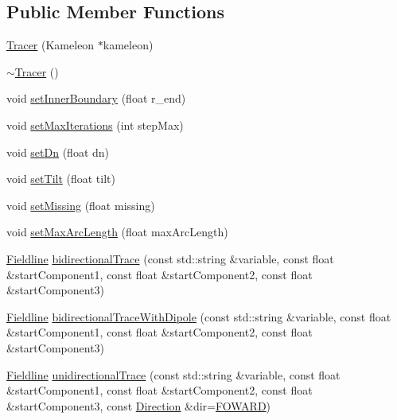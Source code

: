 \subsection*{Public Member Functions}
\begin{DoxyCompactItemize}
\item 
\hyperlink{classccmc_1_1_tracer_a16f3484aa70343874800adfce15b7d48}{Tracer} (Kameleon $\ast$kameleon)
\item 
\hyperlink{classccmc_1_1_tracer_ac9c1fdded6293841a58a3f672b775577}{$\sim$\-Tracer} ()
\item 
void \hyperlink{classccmc_1_1_tracer_a8b67d175f78a67e8f9119a9b105bfb8b}{set\-Inner\-Boundary} (float r\-\_\-end)
\item 
void \hyperlink{classccmc_1_1_tracer_aecadbaf86210183e93561cfd994e5cb3}{set\-Max\-Iterations} (int step\-Max)
\item 
void \hyperlink{classccmc_1_1_tracer_ab487539d33afad7fb6642d4bd3ccc555}{set\-Dn} (float dn)
\item 
void \hyperlink{classccmc_1_1_tracer_aa729fd6391a148f9bad170a652ec6d7d}{set\-Tilt} (float tilt)
\item 
void \hyperlink{classccmc_1_1_tracer_a2b4ada2551d3d6db929f6f4b59fe6cb0}{set\-Missing} (float missing)
\item 
void \hyperlink{classccmc_1_1_tracer_a22c8cf8a9c801e38f7bd4fe8cc224f1c}{set\-Max\-Arc\-Length} (float max\-Arc\-Length)
\item 
\hyperlink{classccmc_1_1_fieldline}{Fieldline} \hyperlink{classccmc_1_1_tracer_a47783816bdcacaa27f0c4535bba42c1f}{bidirectional\-Trace} (const std\-::string \&variable, const float \&start\-Component1, const float \&start\-Component2, const float \&start\-Component3)
\item 
\hyperlink{classccmc_1_1_fieldline}{Fieldline} \hyperlink{classccmc_1_1_tracer_a15158cc5fe5eb9a0372d85b9d81d798d}{bidirectional\-Trace\-With\-Dipole} (const std\-::string \&variable, const float \&start\-Component1, const float \&start\-Component2, const float \&start\-Component3)
\item 
\hyperlink{classccmc_1_1_fieldline}{Fieldline} \hyperlink{classccmc_1_1_tracer_a3166d314066e3c83e935e01b37554e63}{unidirectional\-Trace} (const std\-::string \&variable, const float \&start\-Component1, const float \&start\-Component2, const float \&start\-Component3, const \hyperlink{classccmc_1_1_tracer_a2c914b28e2e205cb1a7c01f2941fcae2}{Direction} \&dir=\hyperlink{classccmc_1_1_tracer_a2c914b28e2e205cb1a7c01f2941fcae2a133381f1178a2affb0f1c79a67b45e52}{F\-O\-W\-A\-R\-D})

\end{DoxyCompactItemize}
